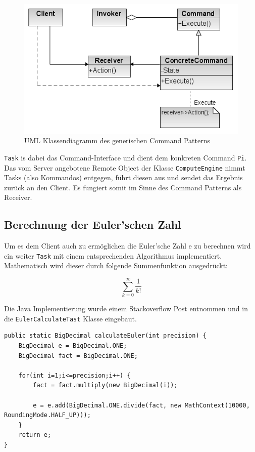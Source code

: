 \begin{figure}[!h]
	\begin{center}
		\includegraphics[width=0.5\linewidth]{images/Command_design_pattern.png}
		\caption{UML Klassendiagramm des generischen Command Patterns \cite{command-pattern-uml}}
		\label{broker}
	\end{center}
\end{figure}

\texttt{Task} is dabei das Command-Interface und dient dem konkreten Command \texttt{Pi}.
Das vom Server angebotene Remote Object der Klasse \texttt{ComputeEngine} nimmt Tasks (also Kommandos) entgegen, f\"uhrt diesen aus und sendet das Ergebnis zur\"uck an den Client.
Es fungiert somit im Sinne des Command Patterns als Receiver.

\subsection{Berechnung der Euler'schen Zahl}
Um es dem Client auch zu erm\"oglichen die Euler'sche Zahl e zu berechnen wird ein weiter \texttt{Task} mit einem entsprechenden Algorithmus implementiert.
Mathematisch wird dieser durch folgende Summenfunktion ausgedr\"uckt:

\begin{equation*}
\displaystyle\sum_{k=0}^{\infty} \dfrac{1}{k!}
\end{equation*}

Die Java Implementierung wurde einem Stackoverflow Post\cite{euler-stackoverflow} entnommen und in die \texttt{EulerCalculateTast} Klasse eingebaut.

\begin{lstlisting}[style=Java, caption=Funktion zur n\"aeherungweisen Berechnung der Euler'schen Zahl]
public static BigDecimal calculateEuler(int precision) {
    BigDecimal e = BigDecimal.ONE;
    BigDecimal fact = BigDecimal.ONE;

    for(int i=1;i<=precision;i++) {
        fact = fact.multiply(new BigDecimal(i));

        e = e.add(BigDecimal.ONE.divide(fact, new MathContext(10000, RoundingMode.HALF_UP)));
    }
    return e;
}
\end{lstlisting}


